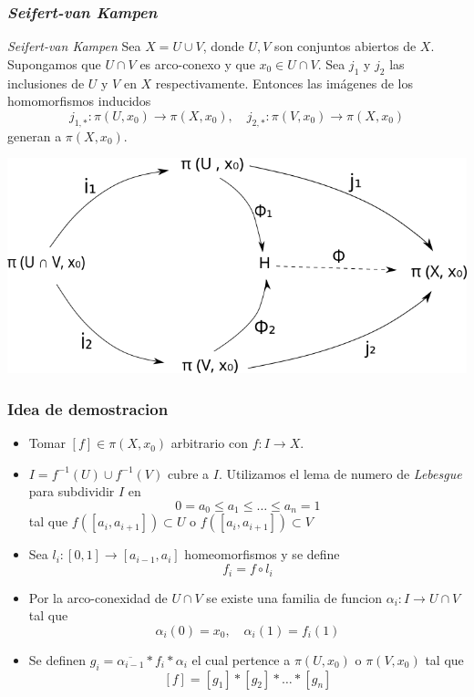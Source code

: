 \documentclass[xetex,mathserif,serif]{beamer}
\newcommand{\vank}{\emph{Seifert-van Kampen} }
\begin{document}
  \begin{frame}
    \frametitle{\vank}
    \begin{block}{\vank}
      Sea \(X = U \cup V\), donde \(U,V\) son conjuntos abiertos de \(X\).
      Supongamos que \(U \cap V\) es arco-conexo y que \(x_0 \in U \cap V\).
      Sea \(j_1\) y \(j_2\) las inclusiones de \(U\) y \(V\) en \(X\)
      respectivamente. Entonces las imágenes de los homomorfismos inducidos
      \[ j_{1,*} : \pi (U, x_0) \to \pi (X, x_0), \quad j_{2,*} : \pi
      (V, x_0) \to \pi (X, x_0) \]
      generan a \(\pi (X,x_0)\).

      \begin{center}
        \includegraphics[scale=.35]{../tesis/imagenes/van.png}
      \end{center}
    \end{block}
  \end{frame}

  \begin{frame}
    \frametitle{Idea de demostracion}
    \begin{itemize}
    \item Tomar \([f] \in \pi (X, x_0)\) arbitrario con \(f : I \to X\).
    \item \(I = f^{-1} (U) \cup f^{-1} (V) \) cubre a \(I\). Utilizamos
      el lema de numero de \emph{Lebesgue} para subdividir \(I\) en
      \[ 0 =  a_0 \leq a_1 \leq \dots \leq a_n = 1 \]
      tal que \( f ([a_i, a_{i+1}]) \subset U\) o \( f ([a_i, a_{i+1}])
      \subset V \)
    \item Sea \(l_i : [0,1] \to [a_{i-1}, a_i]\) homeomorfismos y se
      define
      \[ f_i = f \circ l_i \]
    \item Por la arco-conexidad de \(U \cap V\) se existe una familia de
      funcion \(\alpha_i : I \to U \cap V\) tal que
      \[ \alpha_i (0) = x_0 , \quad \alpha_i (1) = f_i (1)\]
    \item Se definen \(g_i = \overline{\alpha_{i-1}} * f_i * \alpha_{i}
      \) el cual pertence a \(\pi (U, x_0)\) o \(\pi(V, x_0)\) tal que
      \[ [f] = [g_1] * [g_2] * \dotsc * [g_n] \]
    \end{itemize}
  \end{frame}
\end{document}
